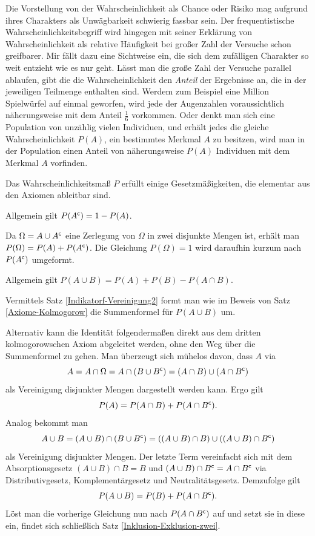 \noindent
Die Vorstellung von der Wahrscheinlichkeit als Chance oder Risiko
mag aufgrund ihres Charakters als Unwägbarkeit schwierig fassbar sein.
Der frequentistische Wahrscheinlichkeitsbegriff wird hingegen mit seiner
Erklärung von Wahrscheinlichkeit als relative Häufigkeit bei großer
Zahl der Versuche schon greifbarer. Mir fällt dazu eine Sichtweise ein,
die sich dem zufälligen Charakter so weit entzieht wie es nur geht.
Lässt man die große Zahl der Versuche parallel ablaufen, gibt die
die Wahrscheinlichkeit den \emph{Anteil} der Ergebnisse an, die in
der jeweiligen Teilmenge enthalten sind. Werdem zum Beispiel eine
Million Spielwürfel auf einmal geworfen, wird jede der Augenzahlen
voraussichtlich näherungsweise mit dem Anteil $\frac{1}{6}$ vorkommen.
Oder denkt man sich eine Population von unzählig vielen Individuen,
und erhält jedes die gleiche Wahrscheinlichkeit $P(A)$, ein
bestimmtes Merkmal $A$ zu besitzen, wird man in der Population einen
Anteil von näherungsweise $P(A)$ Individuen mit dem Merkmal $A$ vorfinden.

Das Wahrscheinlichkeitsmaß $P$ erfüllt einige Gesetzmäßigkeiten, die
elementar aus den Axiomen ableitbar sind.

\begin{Satz}
Allgemein gilt $P(A^\mathsf c) = 1 - P(A)$.
\end{Satz}
\begin{Beweis}
Da $\Omega = A\cup A^\mathsf c$ eine Zerlegung von $\Omega$ in zwei
disjunkte Mengen ist, erhält man $P(\Omega)=P(A)+P(A^\mathsf c)$.
Die Gleichung $P(\Omega)=1$ wird daraufhin kurzum nach $P(A^\mathsf c)$
umgeformt.\,\qedsymbol
\end{Beweis}

\begin{Satz}\label{Inklusion-Exklusion-zwei}
Allgemein gilt $P(A\cup B) = P(A) + P(B) - P(A\cap B)$.
\end{Satz}
\begin{Beweis}
Vermittels Satz \ref{Indikatorf-Vereinigung2} formt man wie im Beweis
von Satz \ref{Axiome-Kolmogorow} die Summenformel für
$P(A\cup B)$ um.\,\qedsymbol
\end{Beweis}

\noindent
Alternativ kann die Identität folgendermaßen direkt aus dem dritten
kolmogorowschen Axiom abgeleitet werden, ohne den Weg über die Summenformel
zu gehen. Man überzeugt sich mühelos davon, dass $A$ via%
\[A = A\cap\Omega = A\cap(B\cup B^\mathsf c) = (A\cap B)\cup (A\cap B^\mathsf c)\]
als Vereinigung disjunkter Mengen dargestellt werden kann. Ergo gilt%
\[P(A) = P(A\cap B) + P(A\cap B^\mathsf c).\]
Analog bekommt man
\[A\cup B = (A\cup B)\cap (B\cup B^\mathsf c) =
((A\cup B)\cap B)\cup ((A\cup B)\cap B^\mathsf c)\]
als Vereinigung disjunkter Mengen. Der letzte Term vereinfacht sich
mit dem Absorptionsgesetz $(A\cup B)\cap B = B$ und $(A\cup B)\cap B^\mathsf c
= A\cap B^\mathsf c$ via Distributivgesetz, Komplementärgesetz und
Neutralitätsgesetz. Demzufolge gilt%
\[P(A\cup B) = P(B) + P(A\cap B^\mathsf c).\]
Löst man die vorherige Gleichung nun nach $P(A\cap B^\mathsf c)$ auf
und setzt sie in diese ein, findet sich schließlich Satz
\ref{Inklusion-Exklusion-zwei}.

